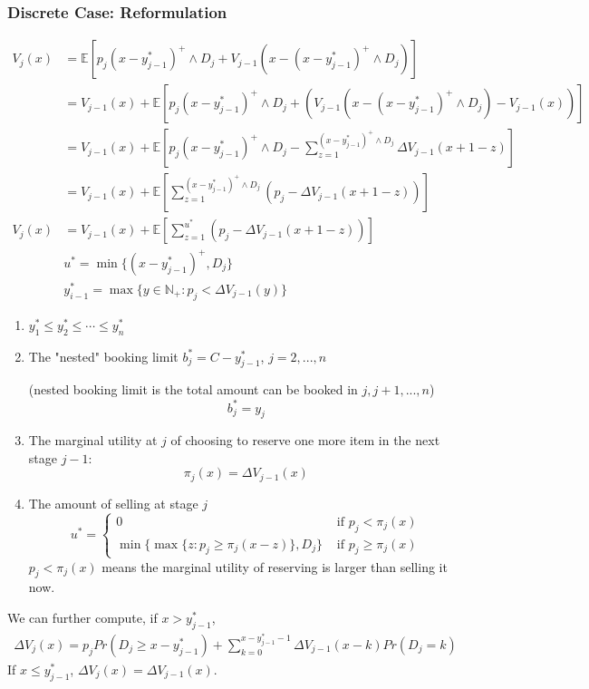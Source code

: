 \documentclass[11pt,a4paper]{article}
\begin{document}
\subsubsection{Discrete Case: Reformulation}
\begin{equation}
    \begin{aligned}
        V_j(x)&=\mathbb{E}[p_j(x-y_{j-1}^*)^+\wedge D_j+V_{j-1}(x-(x-y_{j-1}^*)^+\wedge D_j)]\\
        &=V_{j-1}(x)+\mathbb{E}[p_j(x-y_{j-1}^*)^+\wedge D_j+(V_{j-1}(x-(x-y_{j-1}^*)^+\wedge D_j)-V_{j-1}(x))]\\
        &=V_{j-1}(x)+\mathbb{E}[p_j(x-y_{j-1}^*)^+\wedge D_j-\sum_{z=1}^{(x-y_{j-1}^*)^+\wedge D_j}\Delta V_{j-1}(x+1-z)]\\
        &=V_{j-1}(x)+\mathbb{E}[\sum_{z=1}^{(x-y_{j-1}^*)^+\wedge D_j}(p_j-\Delta V_{j-1}(x+1-z))]\\
        V_j(x)&=V_{j-1}(x)+\mathbb{E}[\sum_{z=1}^{u^*}(p_j-\Delta V_{j-1}(x+1-z))]\\
        &u^*=\min\{(x-y_{j-1}^*)^+,D_j\}\\
        &y_{i-1}^*=\max\{y\in \mathbb{N}_+: p_j<\Delta V_{j-1}(y) \}
    \end{aligned}
    \nonumber
\end{equation}
\begin{enumerate}[$\bullet$]
    \item $y_1^*\leq y_2^*\leq \cdots\leq y_n^*$
    \item The "nested" booking limit $b_j^*=C-y_{j-1}^*$, $j=2,...,n$
    
    (nested booking limit is the total amount can be booked in $j,j+1,...,n$)
    $$b_j^*=y_j$$
    \item The marginal utility at $j$ of choosing to reserve one more item in the next stage $j-1$: $$\pi_j(x)=\Delta V_{j-1}(x)$$
    \item The amount of selling at stage $j$ $$u^*=\left\{\begin{matrix}
        0&\text{ if }p_j<\pi_j(x)\\
        \min\{\max\{z:p_j\geq \pi_j(x-z)\},D_j\}&\text{ if }p_j\geq \pi_j(x)
    \end{matrix}\right.$$
     $p_j<\pi_j(x)$ means the marginal utility of reserving is larger than selling it now.
\end{enumerate}

We can further compute, if $x>y_{j-1}^*$,
\begin{equation}
    \begin{aligned}
        \Delta V_j(x)=
            p_jPr(D_j\geq x-y_{j-1}^*)+\sum_{k=0}^{x-y_{j-1}^*-1}\Delta V_{j-1}(x-k)Pr(D_j=k)
    \end{aligned}
    \nonumber
\end{equation}
If $x\leq y_{j-1}^*$, $\Delta V_j(x)=\Delta V_{j-1}(x)$.
\end{document}
